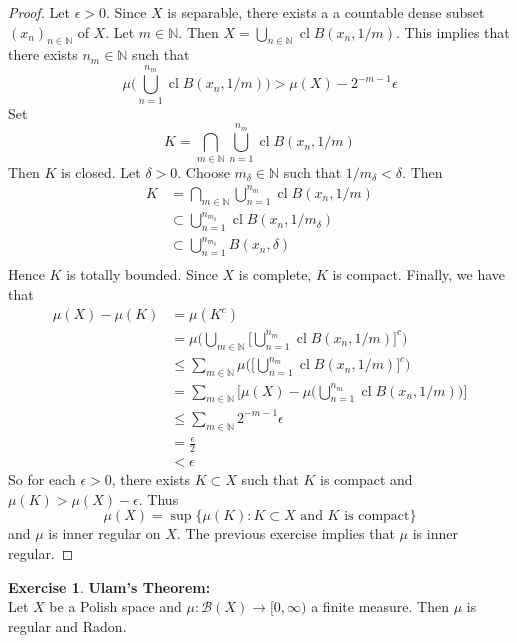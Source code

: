 \documentclass{book}
\theoremstyle{definition}
\newtheorem{ex}[definition]{Exercise}
\newcommand{\del}{\delta}
\newcommand{\ep}{\epsilon}
\newcommand{\N}{\mathbb{N}}
\newcommand{\MB}{\mathcal{B}}
\DeclareMathOperator{\cl}{cl}
\DeclareMathOperator*{\0}{\mbf{0}}
\DeclareMathOperator*{\1}{\mbf{1}}
\begin{document}
	\begin{proof}
		Let $\ep >0$. Since $X$ is separable, there exists a a countable dense subset $(x_{n})_{n \in \N}$ of $X$. Let $m \in \N$. Then $X = \bigcup\limits_{n \in \N} \cl B(x_n, 1/m)$. This implies that there exists $n_m \in \N$ such that 
		$$\mu \bigg(\bigcup\limits_{n = 1}^{n_m} \cl B(x_n, 1/m) \bigg) > \mu(X) - 2^{-m-1}\ep$$ 
		Set 
		$$K = \bigcap\limits_{m \in \N} \bigcup\limits_{n = 1}^{n_m} \cl B(x_n, 1/m) $$
		Then $K$ is closed. Let $\del >0$. Choose $m_{\del} \in \N$ such that $1/m_{\del} < \del$. Then 
		\begin{align*}
			K 
			&=  \bigcap\limits_{m \in \N} \bigcup\limits_{n = 1}^{n_m} \cl B(x_n, 1/m) \\
			& \subset \bigcup\limits_{n = 1}^{n_{m_{\del}}} \cl B(x_n, 1/{m_{\del}}) \\
			& \subset  \bigcup\limits_{n = 1}^{n_{m_{\del}}} B(x_n, \del) \\ 
		\end{align*}
		Hence $K$ is totally bounded. Since $X$ is complete, $K$ is compact. Finally, we have that 
		\begin{align*}
			\mu(X) - \mu(K)
			&= \mu(K^c) \\
			&= \mu \bigg( \bigcup\limits_{m \in \N} \bigg[ \bigcup\limits_{n = 1}^{n_m} \cl B(x_n, 1/m) \bigg]^c  \bigg) \\
			&\leq \sum_{m \in \N} \mu \bigg( \bigg[ \bigcup\limits_{n = 1}^{n_m} \cl B(x_n, 1/m) \bigg]^c \bigg) \\
			&= \sum_{m \in \N} \bigg[ \mu(X) - \mu \bigg(  \bigcup\limits_{n = 1}^{n_m} \cl B(x_n, 1/m)  \bigg) \bigg] \\
			& \leq \sum_{m \in \N} 2^{-m-1}\ep \\
			&= \frac{\ep}{2} \\
			&< \ep
		\end{align*} 
	So for each $\ep >0$, there exists $K \subset X$ such that $K$ is compact and $\mu(K) > \mu(X) - \ep$. Thus $$\mu(X) = \sup\{\mu(K): \text{$K \subset X$ and $K$ is compact}\}$$ and $\mu$ is inner regular on $X$. The previous exercise implies that $\mu$ is inner regular.   
	\end{proof}
	
	\begin{ex} \textbf{Ulam's Theorem:} \\
		Let $X$ be a Polish space and $\mu: \MB(X) \rightarrow [0, \infty)$ a finite measure. Then $\mu$ is regular and Radon.
	\end{ex}
\end{document}

